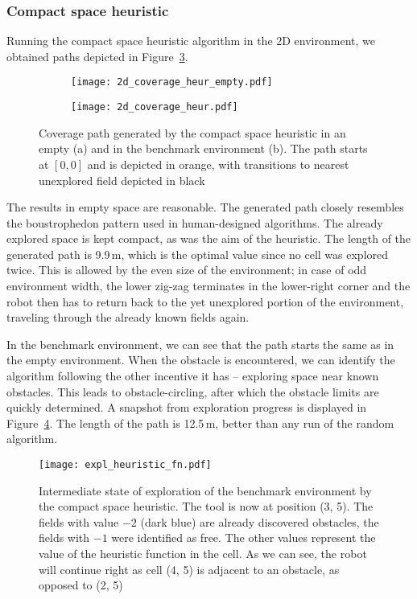 \documentclass[buriama8_dp.tex]{subfiles}
\begin{document}
\subsubsection{Compact space heuristic}
Running the compact space heuristic algorithm in the 2D environment, we obtained paths depicted in Figure~\ref{fig:heur_2d_coverage}.

\begin{figure}[htp]
  \centering
  \begin{subfigure}[t]{0.49\textwidth}
    \texttt{[image: 2d\_coverage\_heur\_empty.pdf]}
    \caption{}
    \label{fig:heur_2d_empty}
  \end{subfigure}
  \begin{subfigure}[t]{0.49\textwidth}
    \texttt{[image: 2d\_coverage\_heur.pdf]}
    \caption{}
    \label{fig:heur_2d_env}
  \end{subfigure}
  
  \caption[Coverage path -- compact space heuristic in 2D]{Coverage path generated by the compact space heuristic in an empty (a) and in the benchmark environment (b). The path starts at \([0,0]\) and is depicted in orange, with transitions to nearest unexplored field depicted in black}
  \label{fig:heur_2d_coverage}
\end{figure}

The results in empty space are reasonable. The generated path closely resembles the boustrophedon pattern used in human-designed algorithms. The already explored space is kept compact, as was the aim of the heuristic. The length of the generated path is 9.9\,m, which is the optimal value since no cell was explored twice. This is allowed by the even size of the environment; in case of odd environment width, the lower zig-zag terminates in the lower-right corner and the robot then has to return back to the yet unexplored portion of the environment, traveling through the already known fields again.

In the benchmark environment, we can see that the path starts the same as in the empty environment. When the obstacle is encountered, we can identify the algorithm following the other incentive it has -- exploring space near known obstacles. This leads to obstacle-circling, after which the obstacle limits are quickly determined. A snapshot from exploration progress is displayed in Figure~\ref{fig:heur_fn}. The length of the path is 12.5\,m, better than any run of the random algorithm.

\begin{figure}[htp]
  \centering
  \texttt{[image: expl\_heuristic\_fn.pdf]}
  \caption[Inner state of heuristic algorithm]{Intermediate state of exploration of the benchmark environment by the compact space heuristic. The tool is now at position (3, 5). The fields with value \(-2\) (dark blue) are already discovered obstacles, the fields with \(-1\) were identified as free. The other values represent the value of the heuristic function in the cell. As we can see, the robot will continue right as cell (4, 5) is adjacent to an obstacle, as opposed to (2, 5)}
  \label{fig:heur_fn}
\end{figure}
\end{document}
